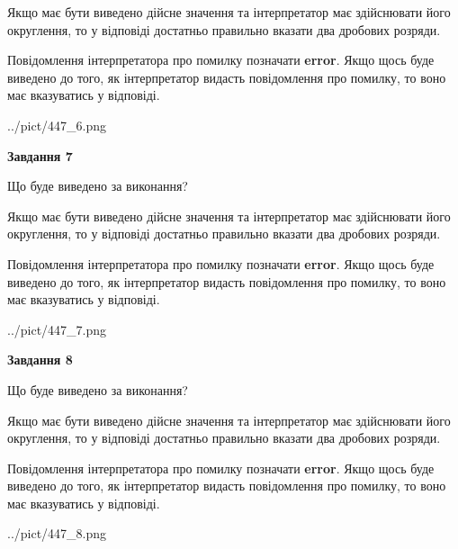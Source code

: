\documentclass[12pt, ukrainian]{article}
\begin{document}
{\begin {Large}
Якщо має бути виведено дійсне значення та інтерпретатор має здійснювати його округлення, 
то у відповіді достатньо правильно вказати два дробових розряди.

Повідомлення інтерпретатора про помилку позначати \textbf{error}.
Якщо щось буде виведено до того, як інтерпретатор видасть повідомлення про помилку, 
то воно має вказуватись у відповіді. \par

\begin{center}
	{../pict/447_6.png}
\end{center}
\newpage

{\begin {center}\textbf{Завдання 7}\end {center}}\par
Що буде виведено за виконання? \par

Якщо має бути виведено дійсне значення та інтерпретатор має здійснювати його округлення, 
то у відповіді достатньо правильно вказати два дробових розряди.

Повідомлення інтерпретатора про помилку позначати \textbf{error}.
Якщо щось буде виведено до того, як інтерпретатор видасть повідомлення про помилку, 
то воно має вказуватись у відповіді. \par

\begin{center}
	{../pict/447_7.png}
\end{center}
\newpage

{\begin {center}\textbf{Завдання 8}\end {center}}\par
Що буде виведено за виконання? \par

Якщо має бути виведено дійсне значення та інтерпретатор має здійснювати його округлення, 
то у відповіді достатньо правильно вказати два дробових розряди.

Повідомлення інтерпретатора про помилку позначати \textbf{error}.
Якщо щось буде виведено до того, як інтерпретатор видасть повідомлення про помилку, 
то воно має вказуватись у відповіді. \par

\begin{center}
	{../pict/447_8.png}
\end{center}
\newpage


\end{Large}}
\end{document}
